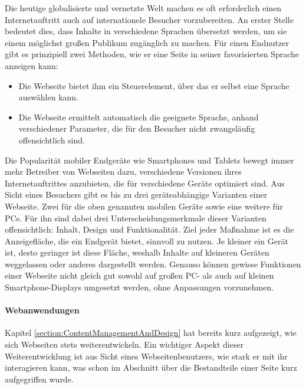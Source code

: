         Die heutige globalisierte und vernetzte Welt machen es oft erforderlich
        einen Internetauftritt auch auf internationele Besucher vorzubereiten.
        An erster Stelle bedeutet dies, dass Inhalte in verschiedene Sprachen
        übersetzt werden, um sie einem möglichst großen Publikum zugänglich zu machen.
        Für einen Endnutzer gibt es prinzipiell zwei Methoden,
        wie er eine Seite in seiner favorisierten Sprache anzeigen kann:

        \begin{itemize}
            \item   Die Webseite bietet ihm ein Steuerelement,
                    über das er selbst eine Sprache auswählen kann.
            \item   Die Webseite ermittelt automatisch die geeignete Sprache,
                    anhand verschiedener Parameter, die für den Besucher nicht zwangsläufig
                    offensichtlich sind.
        \end{itemize}

        Die Popularität mobiler Endgeräte wie Smartphones und Tablets
        bewegt immer mehr Betreiber von Webseiten dazu,
        verschiedene Versionen ihres Internetauftrittes anzubieten,
        die für verschiedene Geräte optimiert sind.
        Aus Sicht eines Besuchers gibt es bis zu drei geräteabhängige
        Varianten einer Webseite. Zwei für die oben genannten mobilen Geräte
        sowie eine weitere für PCs.
        Für ihn sind dabei drei Unterscheidungsmerkmale dieser Varianten offensichtlich:
        Inhalt, Design und Funktionalität.
        Ziel jeder Maßnahme ist es die Anzeigefläche,
        die ein Endgerät bietet, sinnvoll zu nutzen.
        Je kleiner ein Gerät ist, desto geringer ist diese Fläche,
        weshalb Inhalte auf kleineren Geräten weggelassen oder anderes
        dargestellt werden.
        Genauso können gewisse Funktionen einer Webseite nicht gleich
        gut sowohl auf großen PC- als auch auf kleinen Smartphone-Displays
        umgesetzt werden, ohne Anpassungen vorzunehmen.
        
        \paragraph*{Webanwendungen}
        Kapitel \ref{section:ContentManagementAndDesign} hat bereits
        kurz aufgezeigt, wie sich Webseiten stets weiterentwickeln.
        Ein wichtiger Aspekt dieser Weiterentwicklung ist aus Sicht
        eines Webseitenbenutzers, wie stark er mit ihr interagieren kann,
        was schon im Abschnitt über die Bestandteile einer Seite kurz aufgegriffen wurde.

